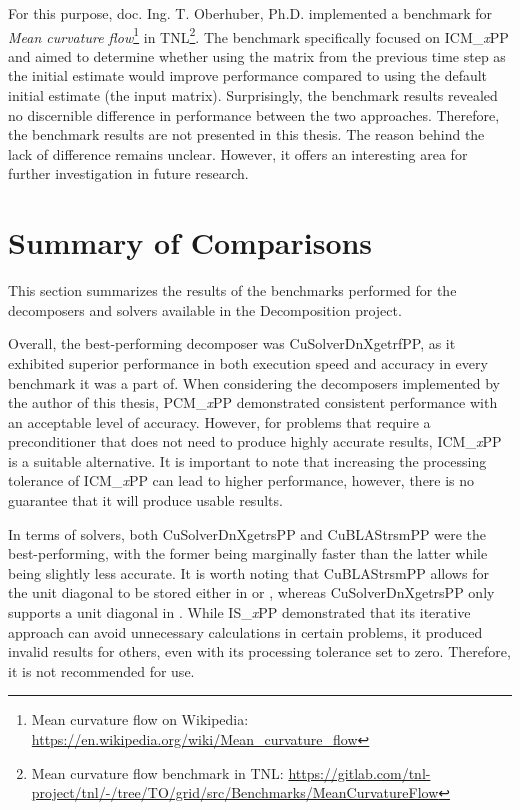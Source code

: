 For this purpose, doc. Ing. T. Oberhuber, Ph.D. implemented a benchmark for \textit{Mean curvature flow}\footnote{Mean curvature flow on Wikipedia: \url{https://en.wikipedia.org/wiki/Mean_curvature_flow}} in TNL\footnote{Mean curvature flow benchmark in TNL: \url{https://gitlab.com/tnl-project/tnl/-/tree/TO/grid/src/Benchmarks/MeanCurvatureFlow}}.
The benchmark specifically focused on ICM\_\textit{x}PP and aimed to determine whether using the  matrix from the previous time step as the initial estimate would improve performance compared to using the default initial estimate (the input matrix).
Surprisingly, the benchmark results revealed no discernible difference in performance between the two approaches.
Therefore, the benchmark results are not presented in this thesis.
The reason behind the lack of difference remains unclear.
However, it offers an interesting area for further investigation in future research.




\section{Summary of Comparisons}\label{Section:comparing-decomposers-and-solvers->summary-of-comparisons}
This section summarizes the results of the benchmarks performed for the decomposers and solvers available in the Decomposition project.

Overall, the best-performing decomposer was CuSolverDnXgetrfPP, as it exhibited superior performance in both execution speed and accuracy in every benchmark it was a part of.
When considering the decomposers implemented by the author of this thesis, PCM\_\textit{x}PP demonstrated consistent performance with an acceptable level of accuracy.
However, for problems that require a preconditioner that does not need to produce highly accurate results, ICM\_\textit{x}PP is a suitable alternative.
It is important to note that increasing the processing tolerance of ICM\_\textit{x}PP can lead to higher performance, however, there is no guarantee that it will produce usable results.

In terms of solvers, both CuSolverDnXgetrsPP and CuBLAStrsmPP were the best-performing, with the former being marginally faster than the latter while being slightly less accurate.
It is worth noting that CuBLAStrsmPP allows for the unit diagonal to be stored either in  or , whereas CuSolverDnXgetrsPP only supports a unit diagonal in .
While IS\_\textit{x}PP demonstrated that its iterative approach can avoid unnecessary calculations in certain problems, it produced invalid results for others, even with its processing tolerance set to zero.
Therefore, it is not recommended for use.
